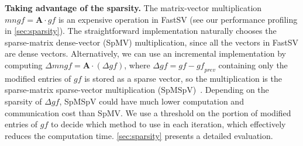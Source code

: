 \documentclass{sokendai_thesis} %
\begin{document}
\textbf{Taking advantage of the sparsity.}
The matrix-vector multiplication $\mathit{mngf}=\mathbf{A}\cdot\mathit{gf}$ is an expensive operation in FastSV (see our performance profiling in \autoref{sec:sparsity}).
The straightforward implementation naturally chooses the sparse-matrix dense-vector (SpMV) multiplication, since all the vectors in FastSV are dense vectors.
Alternatively, we can use an incremental implementation by computing $\Delta\mathit{mngf}=\mathbf{A}\cdot(\Delta\mathit{gf})$, where $\Delta\mathit{gf} = \mathit{gf} - \mathit{gf}_{\mathit{prev}}$ containing only the modified entries of $\mathit{gf}$ is stored as a sparse vector, so the multiplication is the sparse-matrix sparse-vector multiplication (SpMSpV)~\cite{azad2017work}.
Depending on the sparsity of $\Delta\mathit{gf}$, SpMSpV could have much lower computation and communication cost than SpMV.
We use a threshold on the portion of modified entries of $\mathit{gf}$ to decide which method to use in each iteration, which effectively reduces the computation time.
\autoref{sec:sparsity} presents a detailed evaluation.

\end{document}
